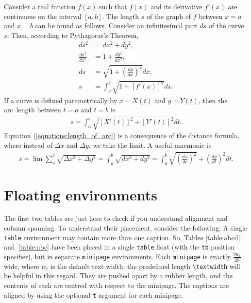 \documentclass[10pt,a4paper]{article}
\theoremstyle{definition}
\begin{document}
    Consider a real function $f(x)$ such that $f(x)$ and its derivative $f'(x)$ are
    continuous on the interval $[a, b]$. The length $s$ of the graph of $f$ between $x = a$
    and $x = b$ can be found as follows. Consider an infinitesimal part $ds$ of the
    curve $s$. Then, according to Pythagoras's Theorem,
    \begin{align}
        ds^2 & = dx^2 + dy^2, \\
        \frac{ds^2}{dx^2} & = 1 + \frac{dy^2}{dx^2}, \\
        ds & = \sqrt{1 + \left(\frac{dy}{dx}\right)^2}dx, \\
        s & = \int_a^b\sqrt{1+[f'(x)]^2}dx.
    \end{align}
    If a curve is defined parametrically by $x = X(t)$ and $y = Y (t)$, then the
    arc~length between $t = a$ and $t = b$ is
    \begin{align}
        s = \int_a^b{\sqrt{[X'(t)]^2 + [Y'(t)]^2}}dt.\label{equations:length_of_arc}
    \end{align}
    Equation (\ref{equations:length_of_arc}) is a consequence of the distance formula, where instead of
    $\Delta x$ and $\Delta y$, we take the limit. A useful mnemonic is
    \begin{align}
        s = \lim\sum_a^b{\sqrt{\Delta x^2 + \Delta y^2}} = \int_a^b{\sqrt{dx^2 + dy^2}} = 
		\int_a^b{\sqrt{\left(\frac{dx}{dt}\right)^2}+\left(\frac{dy}{dt}\right)^2}dt.
	\end{align}

    \section{Floating environments}
    The first two tables are just here to check if you understand alignment and
    column spanning. To understand their placement, consider the following: A
    single \texttt{table} environment may contain more than one caption. So, Tables \ref{table:abcd}
	and~\ref{table:abc} have been placed in a single \texttt{table} float (with the \texttt{tb} 
	position specifier), but in separate \texttt{minipage} environments. Each \texttt{minipage}
	is exactly $\frac{9w_t}{20}$ wide, where $w_t$ is the default text width;
    the predefined length \verb$\textwidth$ will be helpful in this regard.
    They are pushed apart by a rubber length, and the contents of each are centred 
    with respect to the minipage. The captions are aligned by using the 
    optional \texttt{t} argument for each minipage.
    
\end{document}
